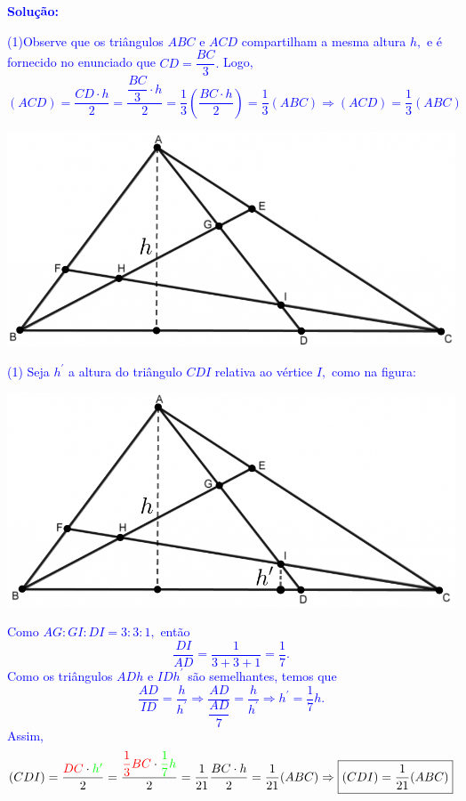 \documentclass[oneside,a4paper,12pt]{article}
\newcommand{\negrito}[1]{\mbox{\boldmath{$#1$}}}
\theoremstyle{Colorido}
\theoremstyle{solu}
\theoremstyle{dotlessP}
\newcommand{\solucao}[1]{\textcolor{blue}{\textbf{Solução:} #1}}
\begin{document}
\solucao{\begin{tasks}[counter-format={(tsk[a])},label-width=3.6ex, label-format = {\bfseries}, column-sep = {20pt}](1)\task[\textcolor{blue}{$\negrito{(a)} $}] Observe que os triângulos $ABC$ e $ACD$ compartilham a mesma altura $h,$ e é fornecido no enunciado que $CD = \dfrac{BC}{3}.$ Logo,\[(ACD) = \dfrac{CD \cdot h}{2} = \dfrac{\dfrac{BC}{3} \cdot h}{2} = \dfrac{1}{3} \left( \dfrac{BC \cdot h}{2} \right) = \dfrac{1}{3}(ABC) \Rightarrow \boxed{(ACD) = \dfrac{1}{3}(ABC)} \]\end{tasks}}
\begin{center}
\includegraphics[scale=0.4]{Provas e Avaliações/Figuras avaliações/13avaliacaociclo3.png}
\end{center}
\textcolor{blue}{\begin{tasks}[counter-format={(tsk[a])},label-width=3.6ex, label-format = {\bfseries}, column-sep = {20pt}](1)
\task[\textcolor{blue}{$\negrito{(b)} $}] Seja  $h^\prime$ a altura do triângulo $CDI$ relativa ao vértice $I,$ como na figura:\end{tasks}}
\begin{center}
\includegraphics[scale=0.4]{Provas e Avaliações/Figuras avaliações/14avaliacaociclo3.png}
\end{center}
\textcolor{blue}{Como $AG:GI:DI=3:3:1,$ então \[\dfrac{DI}{AD} = \dfrac{1}{3 + 3 + 1} = \dfrac{1}{7}.\]
Como os triângulos $ADh$ e $IDh^\prime$ são semelhantes, temos que\[\dfrac{AD}{ID} = \dfrac{h}{h^\prime} \Rightarrow  \dfrac{AD}{\dfrac{AD}{7}} = \dfrac{h}{h^\prime}  \Rightarrow h^\prime = \dfrac{1}{7}h.\]
Assim,\[(CDI) = \dfrac{\textcolor{red}{DC}\cdot \textcolor{green}{h^{\prime}}}{2} = \dfrac{\textcolor{red}{\dfrac{1}{3}BC} \cdot \textcolor{green}{\dfrac{1}{7}h}}{2} = \dfrac{1}{21} \dfrac{BC \cdot h}{2} = \dfrac{1}{21} (ABC) \Rightarrow \boxed{(CDI) =\dfrac{1}{21} (ABC) }\]}
\end{document}
